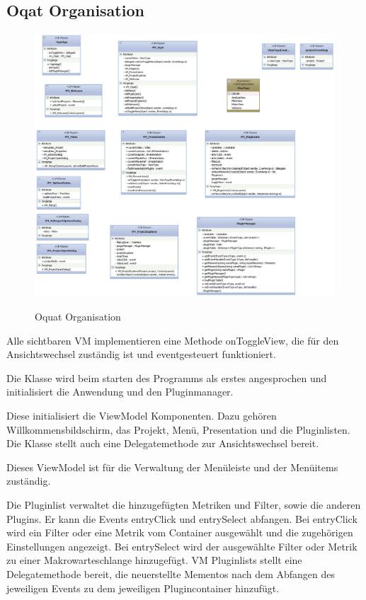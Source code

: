 \subsection{Oqat Organisation}
\begin{figure}[h]
\noindent\includegraphics[width=\linewidth,height=\textheight,
keepaspectratio]{bilder/VM.png}
\label{}
\caption{Oquat Organisation}
\end{figure}

Alle sichtbaren VM implementieren eine Methode onToggleView, die für den Ansichtswechsel zuständig ist und eventgesteuert funktioniert.

Die Klasse wird beim starten des Programms als erstes angesprochen und initialisiert die Anwendung und den Pluginmanager.


Diese initialisiert die ViewModel Komponenten. Dazu gehören Willkommensbildschirm, das Projekt, Menü, Presentation und die Pluginlisten. Die Klasse stellt auch eine Delegatemethode zur Ansichtswechsel bereit.


Dieses ViewModel ist für die Verwaltung der Menüleiste und der Menüitems zuständig.


Die Pluginlist verwaltet die hinzugefügten Metriken und Filter, sowie die anderen Plugins. Er kann die Events entryClick und entrySelect abfangen. Bei entryClick wird ein Filter oder eine Metrik vom Container ausgewählt und die zugehörigen Einstellungen angezeigt. Bei entrySelect wird der ausgewählte Filter oder Metrik zu einer Makrowarteschlange hinzugefügt. VM Pluginlists stellt eine Delegatemethode bereit, die neuerstellte Mementos nach dem Abfangen des jeweiligen Events zu dem jeweiligen Plugincontainer hinzufügt.


